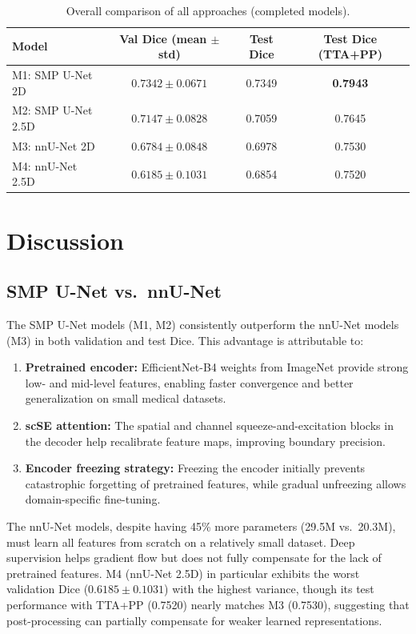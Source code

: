 \documentclass[11pt,a4paper]{article}
\begin{document}
\begin{table}[H]
\centering
\caption{Overall comparison of all approaches (completed models).}
\label{tab:summary}
\begin{tabular}{lccc}
\toprule
\textbf{Model} & \textbf{Val Dice (mean $\pm$ std)} & \textbf{Test Dice} & \textbf{Test Dice (TTA+PP)} \\
\midrule
M1: SMP U-Net 2D     & $0.7342 \pm 0.0671$ & 0.7349 & \textbf{0.7943} \\
M2: SMP U-Net 2.5D   & $0.7147 \pm 0.0828$ & 0.7059 & 0.7645 \\
M3: nnU-Net 2D       & $0.6784 \pm 0.0848$ & 0.6978 & 0.7530 \\
M4: nnU-Net 2.5D     & $0.6185 \pm 0.1031$ & 0.6854 & 0.7520 \\
\bottomrule
\end{tabular}
\end{table}

\section{Discussion}

\subsection{SMP U-Net vs.\ nnU-Net}

The SMP U-Net models (M1, M2) consistently outperform the nnU-Net models (M3) in both validation and test Dice. This advantage is attributable to:
\begin{enumerate}
    \item \textbf{Pretrained encoder:} EfficientNet-B4 weights from ImageNet provide strong low- and mid-level features, enabling faster convergence and better generalization on small medical datasets.
    \item \textbf{scSE attention:} The spatial and channel squeeze-and-excitation blocks in the decoder help recalibrate feature maps, improving boundary precision.
    \item \textbf{Encoder freezing strategy:} Freezing the encoder initially prevents catastrophic forgetting of pretrained features, while gradual unfreezing allows domain-specific fine-tuning.
\end{enumerate}

The nnU-Net models, despite having 45\% more parameters (29.5M vs.\ 20.3M), must learn all features from scratch on a relatively small dataset. Deep supervision helps gradient flow but does not fully compensate for the lack of pretrained features. M4 (nnU-Net 2.5D) in particular exhibits the worst validation Dice ($0.6185 \pm 0.1031$) with the highest variance, though its test performance with TTA+PP (0.7520) nearly matches M3 (0.7530), suggesting that post-processing can partially compensate for weaker learned representations.
\end{document}
